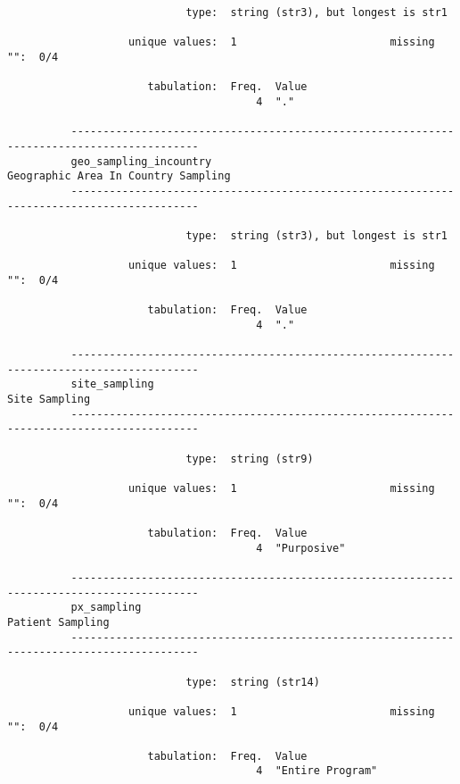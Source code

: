 \documentclass{article}
\begin{document}
\begin{verbatim}
                            type:  string (str3), but longest is str1
          
                   unique values:  1                        missing "":  0/4
          
                      tabulation:  Freq.  Value
                                       4  "."
          
          ------------------------------------------------------------------------------------------
          geo_sampling_incountry                                 Geographic Area In Country Sampling
          ------------------------------------------------------------------------------------------
          
                            type:  string (str3), but longest is str1
          
                   unique values:  1                        missing "":  0/4
          
                      tabulation:  Freq.  Value
                                       4  "."
          
          ------------------------------------------------------------------------------------------
          site_sampling                                                                Site Sampling
          ------------------------------------------------------------------------------------------
          
                            type:  string (str9)
          
                   unique values:  1                        missing "":  0/4
          
                      tabulation:  Freq.  Value
                                       4  "Purposive"
          
          ------------------------------------------------------------------------------------------
          px_sampling                                                               Patient Sampling
          ------------------------------------------------------------------------------------------
          
                            type:  string (str14)
          
                   unique values:  1                        missing "":  0/4
          
                      tabulation:  Freq.  Value
                                       4  "Entire Program"
          

\end{verbatim}
\end{document}
